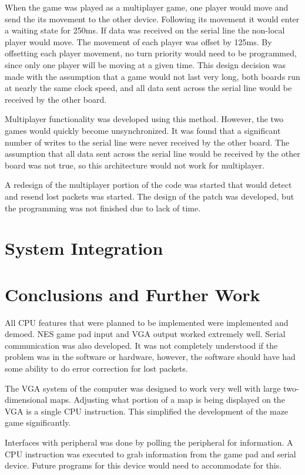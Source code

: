 \documentclass{article}
\begin{document}
When the game was played as a multiplayer game, one player would move and send the its movement to the other device.  Following its movement it would enter a waiting state for 250ms.  If data was received on the serial line the non-local player would move.  The movement of each player was offset by 125ms.  By offsetting each player movement, no turn priority would need to be programmed, since only one player will be moving at a given time.  This design decision was made with the assumption that a game would not last very long, both boards run at nearly the same clock speed, and all data sent across the serial line would be received by the other board.

Multiplayer functionality was developed using this method.  However, the two games would quickly become unsynchronized.  It was found that a significant number of writes to the serial line were never received by the other board.  The assumption that all data sent across the serial line would be received by the other board was not true, so this architecture would not work for multiplayer.

A redesign of the multiplayer portion of the code was started that would detect and resend lost packets was started.  The design of the patch was developed, but the programming was not finished due to lack of time.

\section{System Integration}

\section{Conclusions and Further Work}

All CPU features that were planned to be implemented were implemented and demoed.  NES game pad input and VGA output worked extremely well.  Serial communication was also developed.  It was not completely understood if the problem was in the software or hardware, however, the software should have had some ability to do error correction for lost packets.

The VGA system of the computer was designed to work very well with large two-dimensional maps.  Adjusting what portion of a map is being displayed on the VGA is a single CPU instruction.  This simplified the development of the maze game significantly.

Interfaces with peripheral was done by polling the peripheral for information.  A CPU instruction was executed to grab information from the game pad and serial device.  Future programs for this device would need to accommodate for this.
\end{document}
